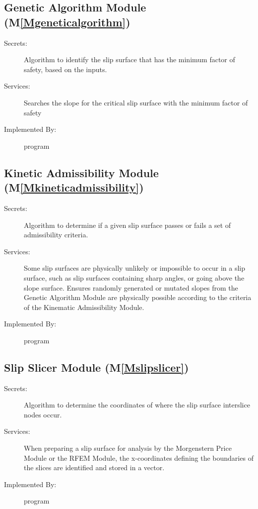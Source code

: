 \documentclass[12pt]{article}
\begin{document}
\subsection{Genetic Algorithm Module (M\ref{Mgeneticalgorithm})}
\label{Sec:GAM()}
\begin{description}
\item[Secrets:]Algorithm to identify the slip surface that has the minimum factor of safety, based on the inputs.
\item[Services:]Searches the slope for the critical slip surface with the minimum factor of safety
\item[Implemented By:]program
\end{description}
\subsection{Kinetic Admissibility Module (M\ref{Mkineticadmissibility})}
\label{Sec:KAM()}
\begin{description}
\item[Secrets:]Algorithm to determine if a given slip surface passes or fails a set of admissibility criteria.
\item[Services:]Some slip surfaces are physically unlikely or impossible to occur in a slip surface, such as slip surfaces containing sharp angles, or going above the slope surface. Ensures randomly generated or mutated slopes from the Genetic Algorithm Module are physically possible according to the criteria of the Kinematic Admissibility Module.
\item[Implemented By:]program
\end{description}
\subsection{Slip Slicer Module (M\ref{Mslipslicer})}
\label{Sec:SSM()}
\begin{description}
\item[Secrets:]Algorithm to determine the coordinates of where the slip surface interslice nodes occur.
\item[Services:]When preparing a slip surface for analysis by the Morgenstern Price Module or the RFEM Module, the x-coordinates defining the boundaries of the slices are identified and stored in a vector.
\item[Implemented By:]program
\end{description}
\end{document}
